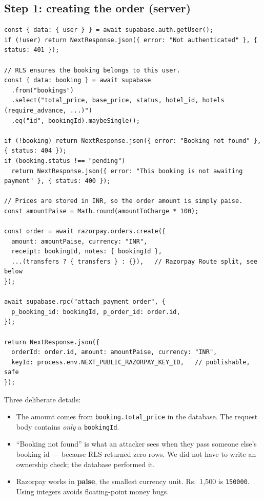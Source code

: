 \documentclass[11pt,a4paper]{article}
\begin{document}
\subsection{Step 1: creating the order (server)}

\begin{lstlisting}[language=TS,caption={app/api/payments/razorpay/order/route.ts (abridged)}]
const { data: { user } } = await supabase.auth.getUser();
if (!user) return NextResponse.json({ error: "Not authenticated" }, { status: 401 });

// RLS ensures the booking belongs to this user.
const { data: booking } = await supabase
  .from("bookings")
  .select("total_price, base_price, status, hotel_id, hotels (require_advance, ...)")
  .eq("id", bookingId).maybeSingle();

if (!booking) return NextResponse.json({ error: "Booking not found" }, { status: 404 });
if (booking.status !== "pending")
  return NextResponse.json({ error: "This booking is not awaiting payment" }, { status: 400 });

// Prices are stored in INR, so the order amount is simply paise.
const amountPaise = Math.round(amountToCharge * 100);

const order = await razorpay.orders.create({
  amount: amountPaise, currency: "INR",
  receipt: bookingId, notes: { bookingId },
  ...(transfers ? { transfers } : {}),   // Razorpay Route split, see below
});

await supabase.rpc("attach_payment_order", {
  p_booking_id: bookingId, p_order_id: order.id,
});

return NextResponse.json({
  orderId: order.id, amount: amountPaise, currency: "INR",
  keyId: process.env.NEXT_PUBLIC_RAZORPAY_KEY_ID,   // publishable, safe
});
\end{lstlisting}

Three deliberate details:

\begin{itemize}[leftmargin=*,noitemsep]
  \item The amount comes from \texttt{booking.total\_price} in the database. The
        request body contains \emph{only} a \texttt{bookingId}.
  \item ``Booking not found'' is what an attacker sees when they pass someone
        else's booking id --- because RLS returned zero rows. We did not have to
        write an ownership check; the database performed it.
  \item Razorpay works in \textbf{paise}, the smallest currency unit. Rs.~1{,}500
        is \texttt{150000}. Using integers avoids floating-point money bugs.
\end{itemize}
\end{document}

